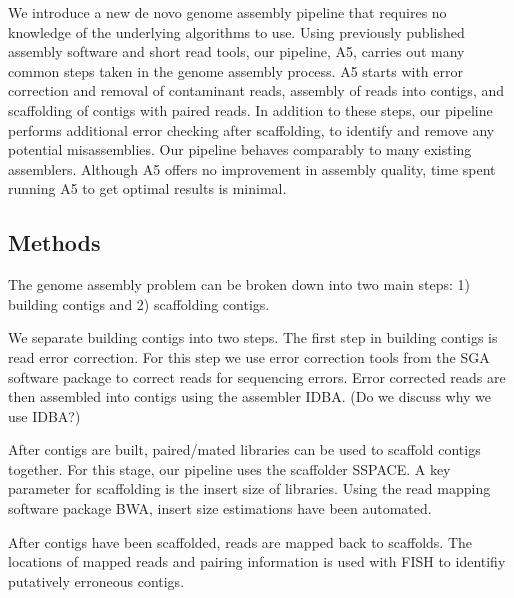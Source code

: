 \documentclass{bioinfo}
\begin{document}
We introduce a new de novo genome assembly pipeline that requires no knowledge
of the underlying algorithms to use. Using previously 
published assembly software and short read tools, our pipeline, A5, carries out
many common steps taken in the genome assembly process. A5 starts with error correction
and removal of contaminant reads, assembly of reads into contigs, and scaffolding
of contigs with paired reads. In addition to these steps, our pipeline performs additional
error checking after scaffolding, to identify and remove any potential misassemblies. 
Our pipeline behaves comparably to many existing assemblers. Although A5 offers no improvement
in assembly quality, time spent running A5 to get optimal results is minimal. 


\begin{methods}
\section{Methods}
The genome assembly problem can be broken down into two main steps: 1) building
contigs and 2) scaffolding contigs. 

We separate building contigs into two steps. The first step in building contigs
is read error correction. For this step we use error correction tools from the
SGA software package to correct reads for sequencing errors. Error corrected reads
are then assembled into contigs using the assembler IDBA. (Do we discuss why we use IDBA?)  

After contigs are built, paired/mated libraries can be used to scaffold contigs 
together. For this stage, our pipeline uses the scaffolder SSPACE. A key 
parameter for scaffolding is the insert size of libraries. Using the read
mapping software package BWA, insert size estimations have been automated. 

After contigs have been scaffolded, reads are mapped back to scaffolds. The locations
of mapped reads and pairing information is used with FISH to identifiy putatively erroneous 
contigs. 



\end{methods}
\end{document}
